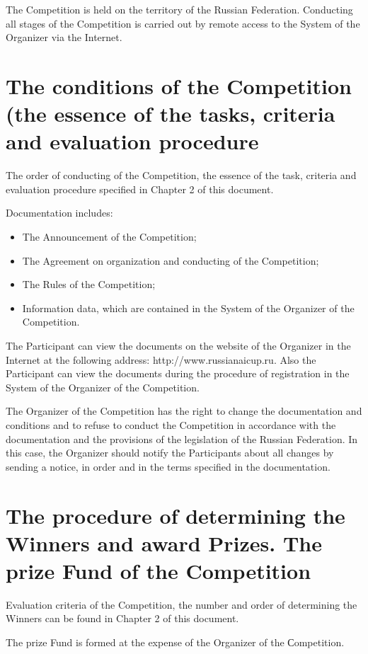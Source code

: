 The Competition is held on the territory of the Russian Federation. Conducting all stages of the Competition is carried out
by remote access to the System of the Organizer via the Internet.

\section{The conditions of the Competition (the essence of the tasks, criteria and evaluation procedure}

The order of conducting of the Competition, the essence of the task, criteria and evaluation procedure specified in Chapter 2 of this document.

Documentation includes:
\begin{itemize}
\item The Announcement of the Competition;
\item The Agreement on organization and conducting of the Competition;
\item The Rules of the Competition;
\item Information data, which are contained in the System of the Organizer of the Competition.
\end{itemize}

The Participant can view the documents on the website of the Organizer in the Internet at the following address:
http://www.russianaicup.ru. Also the Participant can view the documents during the procedure of registration
in the System of the Organizer of the Competition.

The Organizer of the Competition has the right to change the documentation and conditions and to refuse to conduct
the Competition in accordance with the documentation and the provisions of the legislation of the Russian Federation.
In this case, the Organizer should notify the Participants about all changes by sending a notice,
in order and in the terms specified in the documentation.

\section{The procedure of determining the Winners and award Prizes. The prize Fund of the Competition}

Evaluation criteria of the Competition, the number and order of determining the Winners can be found in Chapter 2 of this document.

The prize Fund is formed at the expense of the Organizer of the Сompetition.

